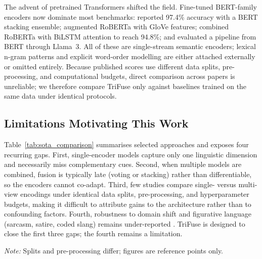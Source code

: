 \documentclass[10pt,twocolumn,a4paper]{article}
\begin{document}
The advent of pretrained Transformers shifted the field. Fine-tuned BERT-family encoders now dominate most benchmarks: \citet{ref14} reported 97.4\% accuracy with a BERT stacking ensemble; \citet{ref15} augmented RoBERTa with GloVe features; \citet{ref33} combined RoBERTa with BiLSTM attention to reach 94.8\%; and \citet{ref38} evaluated a pipeline from BERT through Llama~3. All of these are single-stream semantic encoders; lexical n-gram patterns and explicit word-order modelling are either attached externally or omitted entirely. Because published scores use different data splits, pre-processing, and computational budgets, direct comparison across papers is unreliable; we therefore compare TriFuse only against baselines trained on the same data under identical protocols.

\subsection{Limitations Motivating This Work}\label{subsec:limitations_lit}

Table~\ref{tab:sota_comparison} summarises selected approaches and exposes four recurring gaps. First, single-encoder models capture only one linguistic dimension and necessarily miss complementary cues. Second, when multiple models are combined, fusion is typically late (voting or stacking) rather than differentiable, so the encoders cannot co-adapt. Third, few studies compare single- versus multi-view encodings under identical data splits, pre-processing, and hyperparameter budgets, making it difficult to attribute gains to the architecture rather than to confounding factors. Fourth, robustness to domain shift and figurative language (sarcasm, satire, coded slang) remains under-reported \citep{ref37,ref38}. TriFuse is designed to close the first three gaps; the fourth remains a limitation.

\begin{table}[!t]
\caption{Selected text classification approaches in the abusive-language domain.}
\label{tab:sota_comparison}
\centering
{}

\smallskip
{\scriptsize \textit{Note:} Splits and pre-processing differ; figures are reference points only.}
\end{table}
\end{document}
